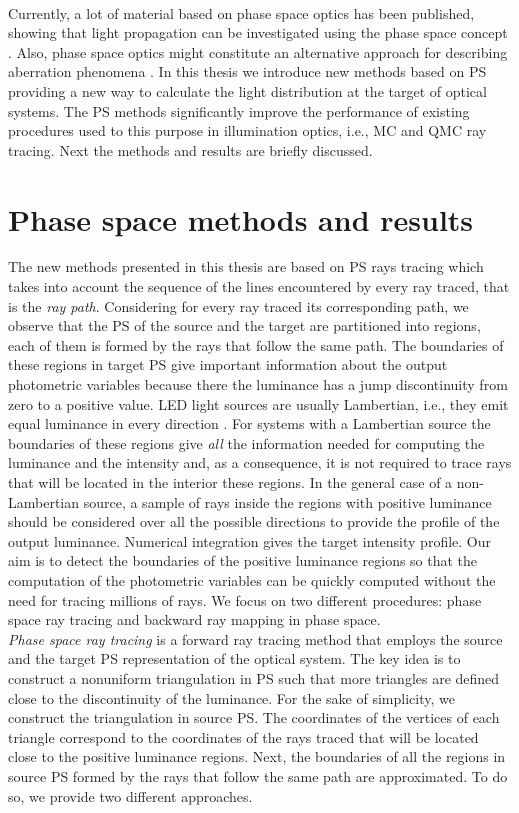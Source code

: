 \\ \indent Currently, a lot of material based on phase space optics has been published, showing that light propagation can be investigated using the phase space concept \cite{rausch2012phase,rausch2014phase, herkommer2012phase}. Also, phase space optics might constitute an alternative approach for describing aberration phenomena \cite{herkommer2013phase, babington2017freeform, wolf1993relativistic}. In this thesis we introduce new methods based on PS providing a new way to calculate the light distribution at the target of optical systems. The PS methods significantly improve the performance of existing procedures used to this purpose in illumination optics, i.e., MC and QMC ray tracing. 
Next the methods and results are briefly discussed. 
\section{Phase space methods and results}
The new methods presented in this thesis are based on PS rays tracing which takes into account the sequence of the lines encountered by every ray traced, that is the \textit{ray path}. Considering for every ray traced its corresponding path, we observe that the PS of the source and the target are partitioned into regions, each of them is formed by the rays that follow the same path. The boundaries of these regions in target PS give important information about the output photometric variables because there the luminance has a jump discontinuity from zero to a positive value. LED light sources are usually Lambertian, i.e., they emit equal luminance in every direction \cite{taylor2000illumination}. For systems with a Lambertian source the boundaries of these regions give \textit{all} the information needed for computing the luminance and the intensity and, as a consequence, it is not required to trace rays that will be located in the interior these regions.
In the general case of a non-Lambertian source, a sample of rays inside the regions with positive luminance should be considered over all the possible directions to provide the profile of the output luminance. Numerical integration gives the target intensity profile. Our aim is to detect the boundaries of the positive luminance regions so that the computation of the photometric variables can be quickly computed without the need for tracing millions of rays. We focus on two different procedures: phase space ray tracing and backward ray mapping in phase space. \\ \indent
\textit{Phase space ray tracing} is a forward ray tracing method that employs the source and the target PS representation of the optical system. The key idea is to construct a nonuniform triangulation in PS such that more triangles are defined close to the discontinuity of the luminance. For the sake of simplicity, we construct the triangulation in source PS. The coordinates of the vertices of each triangle correspond to the coordinates of the rays traced that will be located close to the positive luminance regions. Next, the boundaries of all the regions in source PS formed by the rays that follow the same path are approximated. To do so, we provide two different approaches. \\ \indent
